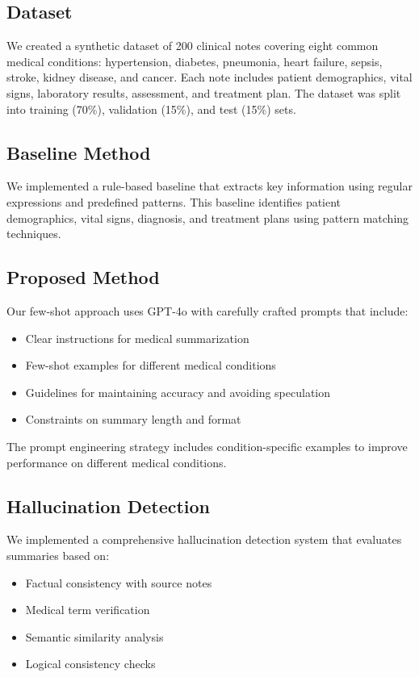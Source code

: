 \documentclass[sigconf]{acmart}
\begin{document}
\subsection{Dataset}

We created a synthetic dataset of 200 clinical notes covering eight common medical conditions: hypertension, diabetes, pneumonia, heart failure, sepsis, stroke, kidney disease, and cancer. Each note includes patient demographics, vital signs, laboratory results, assessment, and treatment plan. The dataset was split into training (70\%), validation (15\%), and test (15\%) sets.

\subsection{Baseline Method}

We implemented a rule-based baseline that extracts key information using regular expressions and predefined patterns. This baseline identifies patient demographics, vital signs, diagnosis, and treatment plans using pattern matching techniques.

\subsection{Proposed Method}

Our few-shot approach uses GPT-4o with carefully crafted prompts that include:
\begin{itemize}
    \item Clear instructions for medical summarization
    \item Few-shot examples for different medical conditions
    \item Guidelines for maintaining accuracy and avoiding speculation
    \item Constraints on summary length and format
\end{itemize}

The prompt engineering strategy includes condition-specific examples to improve performance on different medical conditions.

\subsection{Hallucination Detection}

We implemented a comprehensive hallucination detection system that evaluates summaries based on:
\begin{itemize}
    \item Factual consistency with source notes
    \item Medical term verification
    \item Semantic similarity analysis
    \item Logical consistency checks
\end{itemize}
\end{document}
